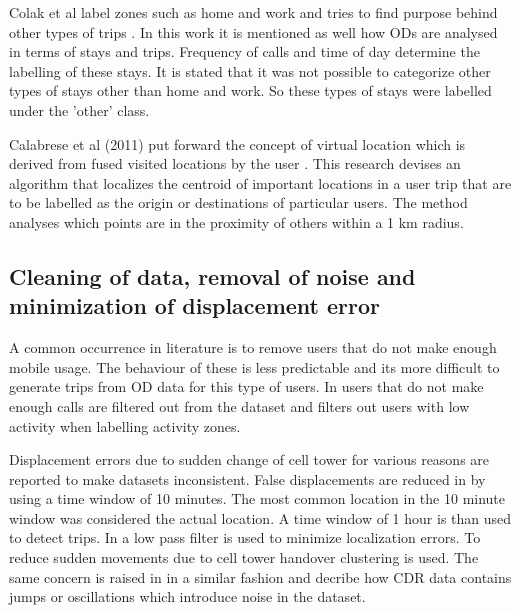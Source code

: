\documentclass[12pt, a4paper]{report}
\theoremstyle{definition}
\theoremstyle{definition}%
\theoremstyle{definition}%
\theoremstyle{definition}%
\theoremstyle{definition}%
\theoremstyle{definition}%
\begin{document}
Colak et al label zones such as home and work and tries to find purpose behind other types of trips \cite{Colak2015}. In this work it is mentioned as well how ODs are analysed in terms of stays and trips. Frequency of calls and time of day determine the labelling of these stays. It is stated that it was not possible to categorize other types of stays other than home and work. So these types of stays were labelled under the 'other' class.

Calabrese et al (2011) put forward the concept of virtual location which is derived from fused visited locations by the user \cite{Calabrese2011}. This research devises an algorithm that localizes the centroid of important locations in a user trip that are to be labelled as the origin or destinations of particular users. The method analyses which points are in the proximity of others within a 1 km radius. 

 


\subsection{Cleaning of data, removal of noise and minimization of displacement error} \label{subsection: data_processing}
A common occurrence in literature is to remove users that do not make enough mobile usage. The behaviour of these is less predictable and its more difficult to generate trips from OD data for this type of users. In \cite{Toole2015} users that do not make enough calls are filtered out from the dataset and \cite{Colak2015} filters out users with low activity when labelling activity zones.

Displacement errors due to sudden change of cell tower for various reasons are reported to make datasets inconsistent. False displacements are reduced in \cite{Iqbal2014} by using a time window of 10 minutes. The most common location in the 10 minute window was considered the actual location. A time window of 1 hour is than used to detect trips. In \cite{Calabrese2011} a low pass filter is used to minimize localization errors. To reduce sudden movements due to cell tower handover clustering is used. The same concern is raised in \cite{Colak2015} in a similar fashion and decribe how CDR data contains jumps or oscillations which introduce noise in the dataset. 
\end{document}

